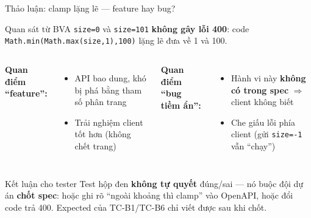 \documentclass[aspectratio=169,12pt]{beamer}
\begin{document}
\begin{frame}{Thảo luận: clamp lặng lẽ --- feature hay bug?}
  \begin{block}{Quan sát từ BVA}
    \texttt{size=0} và \texttt{size=101} \textbf{không gây lỗi 400}:
    code \texttt{Math.min(Math.max(size,1),100)} lặng lẽ đưa về 1 và 100.
  \end{block}

  \vspace{0.3em}
  \begin{columns}[T]
    \textbf{Quan điểm ``feature'':}
    \begin{itemize}
      \item API bao dung, khó bị phá bằng tham số phân trang
      \item Trải nghiệm client tốt hơn (không chết trang)
    \end{itemize}
    \textbf{Quan điểm ``bug tiềm ẩn'':}
    \begin{itemize}
      \item Hành vi này \textbf{không có trong spec} $\Rightarrow$ client không biết
      \item Che giấu lỗi phía client (gửi \texttt{size=-1} vẫn ``chạy'')
    \end{itemize}
  \end{columns}

  \vspace{0.3em}
  \begin{alertblock}{Kết luận cho tester}
    Test hộp đen \textbf{không tự quyết} đúng/sai --- nó buộc đội dự án
    \textbf{chốt spec}: hoặc ghi rõ ``ngoài khoảng thì clamp'' vào OpenAPI,
    hoặc đổi code trả 400. Expected của TC-B1/TC-B6 chỉ viết được sau khi chốt.
  \end{alertblock}
\end{frame}
\end{document}
